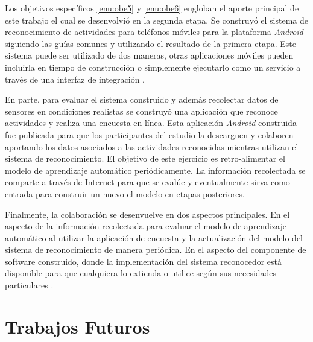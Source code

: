 Los objetivos específicos \ref{enu:obe5} y \ref{enu:obe6} engloban
el aporte principal de este trabajo el cual se desenvolvió en la segunda
etapa. Se construyó el sistema de reconocimiento de actividades para
teléfonos móviles para la plataforma \emph{\hyperlink{abbr}{Android}}
siguiendo las guías comunes y utilizando el resultado de la primera
etapa. Este sistema puede ser utilizado de dos maneras, otras aplicaciones
móviles pueden incluirla en tiempo de construcción o simplemente ejecutarlo
como un servicio a través de una interfaz de integración \cite{GimenezYegros2016a}.

En parte, para evaluar el sistema construido y además recolectar datos
de sensores en condiciones realistas se construyó una aplicación que
reconoce actividades y realiza una encuesta en línea. Esta aplicación
\emph{\hyperlink{abbr}{Android}} construida fue publicada para que
los participantes del estudio la descarguen y colaboren aportando
los datos asociados a las actividades reconocidas mientras utilizan
el sistema de reconocimiento. El objetivo de este ejercicio es retro-alimentar
el modelo de aprendizaje automático periódicamente. La información
recolectada se comparte a través de Internet para que se evalúe y
eventualmente sirva como entrada para construir un nuevo el modelo
en etapas posteriores.

Finalmente, la colaboración se desenvuelve en dos aspectos principales.
En el aspecto de la información recolectada para evaluar el modelo
de aprendizaje automático al utilizar la aplicación de encuesta y
la actualización del modelo del sistema de reconocimiento de manera
periódica. En el aspecto del componente de software construido, donde
la implementación del sistema reconocedor está disponible para que
cualquiera lo extienda o utilice según sus necesidades particulares
\cite{GimenezYegros2016b}.

\section{Trabajos Futuros}

\label{trabajos-futuros}

